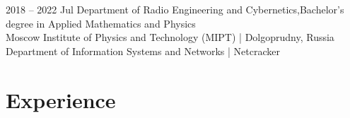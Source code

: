 \documentclass[]{cv-style}          %
\begin{document}
\begin{entrylist}
\entry
{2018 -- 2022 Jul}
{{\normalfont Department of Radio Engineering and Cybernetics,\newline Bachelor's degree in Applied Mathematics and Physics}}
{\\ Moscow Institute of Physics and Technology (MIPT)  |  Dolgoprudny, Russia \\Department of Information Systems and Networks | Netcracker}
{\vspace{-0.3cm}}
\end{entrylist}



\section{Experience}
\end{document}

